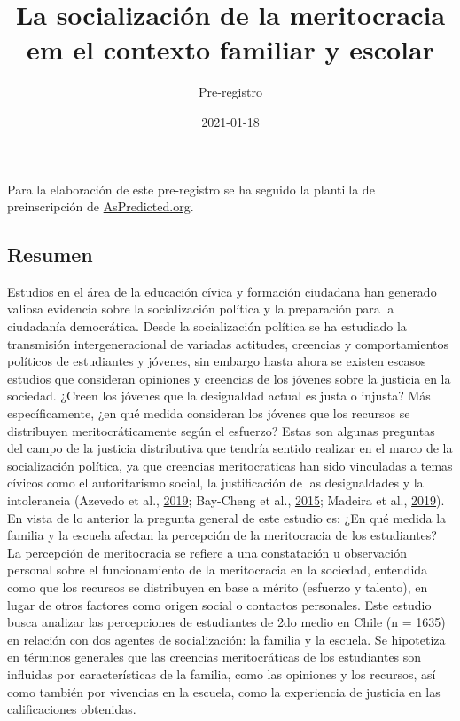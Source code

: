 \documentclass[
  12pt,
]{article}
\title{La socialización de la meritocracia em el contexto familiar y
escolar}
\subtitle{Pre-registro}
\author{}
\date{\vspace{-2.5em}2021-01-18}
\begin{document}
\maketitle

Para la elaboración de este pre-registro se ha seguido la plantilla de
preinscripción de \href{https://aspredicted.org/}{AsPredicted.org}.

\hypertarget{resumen}{%
\subsection{Resumen}\label{resumen}}

Estudios en el área de la educación cívica y formación ciudadana han
generado valiosa evidencia sobre la socialización política y la
preparación para la ciudadanía democrática. Desde la socialización
política se ha estudiado la transmisión intergeneracional de variadas
actitudes, creencias y comportamientos políticos de estudiantes y
jóvenes, sin embargo hasta ahora se existen escasos estudios que
consideran opiniones y creencias de los jóvenes sobre la justicia en la
sociedad. ¿Creen los jóvenes que la desigualdad actual es justa o
injusta? Más específicamente, ¿en qué medida consideran los jóvenes que
los recursos se distribuyen meritocráticamente según el esfuerzo? Estas
son algunas preguntas del campo de la justicia distributiva que tendría
sentido realizar en el marco de la socialización política, ya que
creencias meritocraticas han sido vinculadas a temas cívicos como el
autoritarismo social, la justificación de las desigualdades y la
intolerancia (Azevedo et al.,
\protect\hyperlink{ref-azevedo_Neoliberal_2019}{2019}; Bay-Cheng et al.,
\protect\hyperlink{ref-bay-cheng_Tracking_2015a}{2015}; Madeira et al.,
\protect\hyperlink{ref-madeira_Primes_2019}{2019}). En vista de lo
anterior la pregunta general de este estudio es: ¿En qué medida la
familia y la escuela afectan la percepción de la meritocracia de los
estudiantes? La percepción de meritocracia se refiere a una constatación
u observación personal sobre el funcionamiento de la meritocracia en la
sociedad, entendida como que los recursos se distribuyen en base a
mérito (esfuerzo y talento), en lugar de otros factores como origen
social o contactos personales. Este estudio busca analizar las
percepciones de estudiantes de 2do medio en Chile (n = 1635) en relación
con dos agentes de socialización: la familia y la escuela. Se hipotetiza
en términos generales que las creencias meritocráticas de los
estudiantes son influidas por características de la familia, como las
opiniones y los recursos, así como también por vivencias en la escuela,
como la experiencia de justicia en las calificaciones obtenidas.
\end{document}
